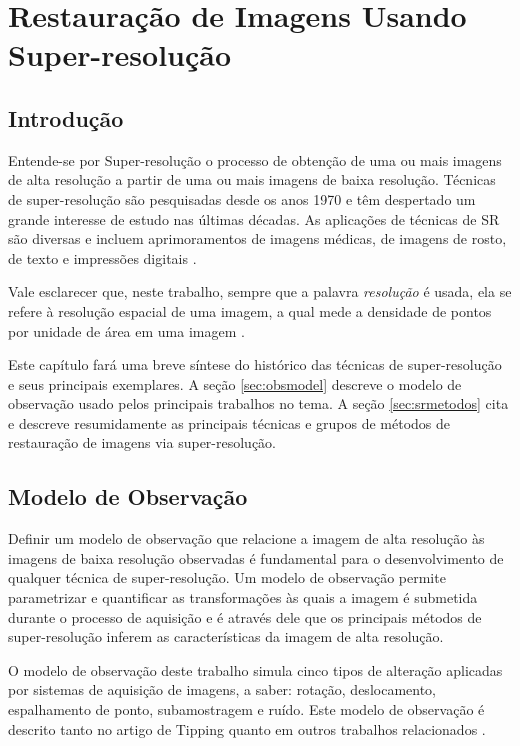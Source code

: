\chapter{Restauração de Imagens Usando Super-resolução}
\label{chap:superRes}
\section{Introdução}
Entende-se por Super-resolução o processo de obtenção de uma ou mais imagens de alta resolução a partir de uma ou mais imagens de baixa resolução.
Técnicas de super-resolução são pesquisadas desde os anos 1970 e têm despertado um grande interesse de estudo nas últimas décadas.
As aplicações de técnicas de SR são diversas e incluem aprimoramentos de imagens médicas, de imagens de rosto, de texto e impressões digitais \cite{nasrollahi2014super}.

Vale esclarecer que, neste trabalho, sempre que a palavra \textit{resolução} é usada,
ela se refere à resolução espacial de uma imagem, a qual mede a densidade de pontos por
unidade de área em uma imagem \cite{zibetti2007super}.

Este capítulo fará uma breve síntese do histórico das técnicas de super-resolução e seus
principais exemplares.
A seção \ref{sec:obsmodel} descreve o modelo de observação usado pelos principais
trabalhos no tema. A seção \ref{sec:srmetodos} cita e descreve resumidamente as
principais técnicas e grupos de métodos de restauração de imagens via super-resolução. 

\section{\label{sec:obsmodel}Modelo de Observação}


Definir um modelo de observação que relacione a imagem de alta resolução às imagens
de baixa resolução observadas é fundamental para o desenvolvimento de qualquer técnica
de super-resolução. Um modelo de observação permite parametrizar e quantificar as
transformações às quais a imagem é submetida durante o processo de aquisição e é
através dele que os principais métodos de super-resolução inferem as características
da imagem de alta resolução.

O modelo de observação deste trabalho simula cinco tipos de alteração aplicadas por
sistemas de aquisição de imagens, a saber: rotação, deslocamento, espalhamento de
ponto, subamostragem e ruído.
Este modelo de observação é descrito tanto no artigo de Tipping
\cite{tipping2003bayesian} quanto em outros trabalhos relacionados
\cite{pickup2007bayesian, Capel01a}.

